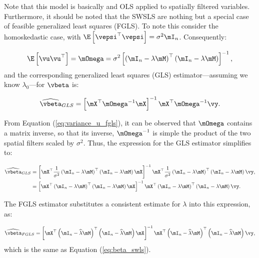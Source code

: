 \documentclass[english,12pt]{book}\usepackage[]{graphicx}\usepackage[]{xcolor}
\begin{document}
Note that this model is basically and OLS applied to spatially filtered variables. Furthermore, it should be noted that the SWSLS are nothing but a special case of feasible generalized least squares (FGLS). To note this consider the homoskedastic case, with $\E\left[\vepsi^\top\vepsi\right]= \sigma^2\mI_n$. Consequently:

\begin{equation}\label{eq:variance_u_fgls}
\E\left[\vu\vu^\top\right] = \mOmega = \sigma^2\left[\left(\mI_n - \lambda\mM\right)^\top\left(\mI_n - \lambda\mM\right)\right]^{-1},
\end{equation}
%
and the corresponding generalized least squares (GLS) estimator---assuming we know $\lambda_0$---for $\vbeta$ is:

\begin{equation*}
\widehat{\vbeta}_{GLS} = \left[\mX^\top\mOmega^{-1}\mX\right]^{-1}\mX^\top\mOmega^{-1}\vy.
\end{equation*}

From Equation (\ref{eq:variance_u_fgls}), it can be observed that $\mOmega$ contains a matrix inverse, so that its inverse, $\mOmega^{-1}$ is simple the product of the two spatial filters scaled by $\sigma^2$. Thus, the expression for the GLS estimator simplifies to:

\begin{equation*}
  \begin{aligned}
  \widehat{\vbeta}_{GLS} & = \left[\mX^\top\frac{1}{\sigma^2}\left(\mI_n - \lambda\mM\right)^\top\left(\mI_n - \lambda\mM\right)\mX\right]^{-1}\mX^\top\frac{1}{\sigma^2}\left(\mI_n -\lambda\mM\right)^\top\left(\mI_n - \lambda\mM\right)\vy,  \\
   & =\left[\mX^\top\left(\mI_n - \lambda\mM\right)^\top\left(\mI_n - \lambda\mM\right)\mX\right]^{-1}\mX^\top\left(\mI_n -\lambda\mM\right)^\top\left(\mI_n - \lambda\mM\right)\vy.
  \end{aligned}
\end{equation*}

The FGLS estimator substitutes a consistent estimate for $\lambda$ into this expression, as:

\begin{equation*}
  \widehat{\vbeta}_{FGLS} =\left[\mX^\top\left(\mI_n - \widehat{\lambda}\mM\right)^\top\left(\mI_n - \widehat{\lambda}\mM\right)\mX\right]^{-1}\mX^\top\left(\mI_n - \widehat{\lambda}\mM\right)^\top\left(\mI_n - \widehat{\lambda}\mM\right)\vy,
\end{equation*}
%
which is the same as Equation (\ref{eq:beta_swls}).
\end{document}
